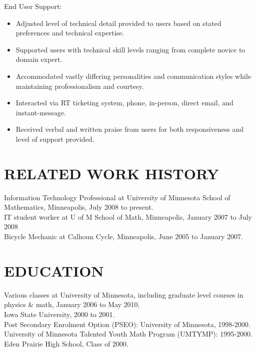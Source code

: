 \documentclass[line,margin]{res}
\begin{document}
\begin{resume}
    End User Support:
    \vspace{2 mm}
    \begin{itemize} \itemsep -1pt %
        \item Adjusted level of technical detail provided to users based
        on stated preferences and technical expertise.
        \item Supported users with technical skill levels ranging from
        complete novice to domain expert.
        \item Accommodated vastly differing personalities and communication
        styles while maintaining professionalism and courtesy.
        \item Interacted via RT ticketing system, phone, in-person, direct
        email, and instant-message.
        \item Received verbal and written praise from users for both
        responsiveness and level of support provided.
    \end{itemize}


\section{RELATED WORK HISTORY}
    Information Technology Professional at University of Minnesota School
    of Mathematics, Minneapolis, July 2008 to present.
    \vspace{1.5 mm} \\
    IT student worker at U of M School of Math, Minneapolis, January 2007
    to July 2008
    \vspace{1.5 mm} \\
    Bicycle Mechanic at Calhoun Cycle, Minneapolis, June 2005 to January
    2007.

\section{EDUCATION}
    Various classes at University of Minnesota, including graduate level
    courses in physics \& math, January 2006 to May 2010.
    \vspace{1.5 mm} \\
    Iowa State University, 2000 to 2001.
    \vspace{1.5 mm} \\
    Post Secondary Enrolment Option (PSEO): University of Minnesota,
    1998-2000.
    \vspace{1.5 mm} \\
    University of Minnesota Talented Youth Math Program (UMTYMP):
    1995-2000.
    \vspace{1.5 mm} \\
    Eden Prairie High School, Class of 2000.


\end{resume}
\end{document}
